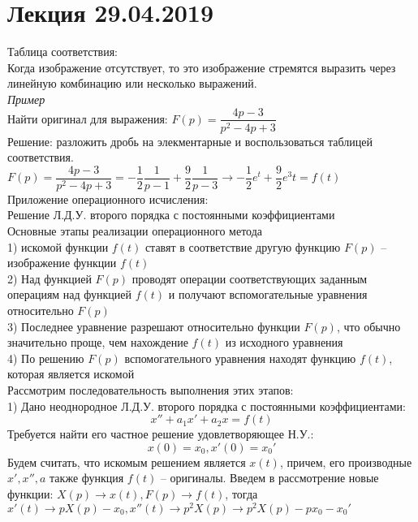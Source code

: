 \documentclass{article}
\numberwithin{equation}{section}
\begin{document}
\section{Лекция 29.04.2019}
Таблица соответствия:\\
Когда изображение отсутствует, то это изображение стремятся выразить через линейную комбинацию или несколько выражений.\\
\textit{Пример}\\
Найти оригинал для выражения: $F(p)=\dfrac{4p-3}{p^2-4p+3}$\\
Решение: разложить дробь на элекментарные и воспользоваться таблицей соответствия.\\
$F(p)=\dfrac{4p-3}{p^2-4p+3}=-\dfrac{1}{2}\dfrac{1}{p-1}+\dfrac{9}{2}\dfrac{1}{p-3}\rightarrow-\dfrac{1}{2}e^t+\dfrac{9}{2}e^3t=f(t)$\\
Приложение операционного исчисления:\\
Решение Л.Д.У. второго порядка с постоянными коэффициентами\\
Основные этапы реализации операционного метода\\
1) искомой функции $f(t)$ ставят в соответствие другую функцию $F(p)$ -- изображение функции $f(t)$\\
2) Над функцией $F(p)$ проводят операции соответствующих заданным операциям над функцией $f(t)$ и получают вспомогательные уравнения относительно $F(p)$\\
3) Последнее уравнение разрешают относительно функции $F(p)$, что обычно значительно проще, чем нахождение $f(t)$ из исходного уравнения\\
4) По решению $F(p)$ вспомогательного уравнения находят функцию $f(t)$, которая является искомой\\
Рассмотрим последовательность выполнения этих этапов:\\
1) Дано неоднородное Л.Д.У. второго порядка с постоянными коэффициентами:
\begin{equation}\label{e69}
x''+a_1x'+a_2x=f(t)    
\end{equation}
Требуется найти его частное решение удовлетворяющее Н.У.:
\begin{equation}\label{e70}
x(0)=x_0, x'(0)=x_0'
\end{equation}
Будем считать, что искомым решением является $x(t)$, причем, его производные $x',x'',a$ также функция $f(t)$ -- оригиналы. Введем в рассмотрение новые функции: $X(p)\rightarrow x(t),F(p)\rightarrow f(t)$, тогда $x'(t)\rightarrow pX(p)-x_0, x''(t)\rightarrow p^2X(p)\rightarrow p^2X(p)-px_0-x_0'$\\
\end{document}
